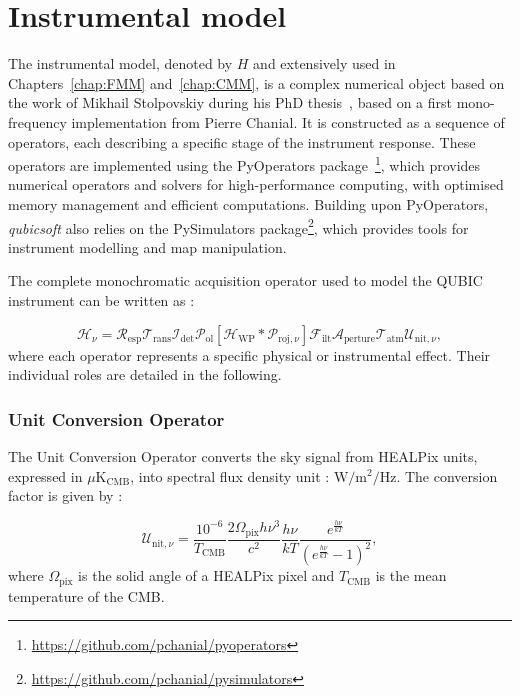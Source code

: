 \documentclass[../../thesis.tex]{subfiles}
\begin{document}
\section{Instrumental model} \label{section:instrumental_model}

The instrumental model, denoted by $H$ and extensively used in Chapters~\ref{chap:FMM} and~\ref{chap:CMM}, is a complex numerical object based on the work of Mikhail Stolpovskiy during his PhD thesis~\cite{thesismikhail}, based on a first mono-frequency implementation from Pierre Chanial. It is constructed as a sequence of operators, each describing a specific stage of the instrument response.
These operators are implemented using the PyOperators package~\cite{PyOperators}\footnote{\url{https://github.com/pchanial/pyoperators}}, which provides numerical operators and solvers for high-performance computing, with optimised memory management and efficient computations. Building upon PyOperators, \emph{qubicsoft} also relies on the PySimulators package\footnote{\url{https://github.com/pchanial/pysimulators}}, which provides tools for instrument modelling and map manipulation.

The complete monochromatic acquisition operator used to model the QUBIC instrument can be written as :

\begin{equation}
    \mathcal{H}_{\nu} = \mathcal{R}_{\text{esp}} \mathcal{T}_{\text{rans}} \mathcal{I}_{\text{det}} \mathcal{P}_{\text{ol}} [\mathcal{H}_{\text{WP}} * \mathcal{P}_{\text{roj}, \nu}] \mathcal{F}_{\text{ilt}} \mathcal{A}_{\text{perture}} \mathcal{T}_{\text{atm}} \mathcal{U}_{\text{nit}, \nu},
    \label{eq:instrumental_model}
\end{equation}
where each operator represents a specific physical or instrumental effect. Their individual roles are detailed in the following.

\subsubsection{Unit Conversion Operator}

The Unit Conversion Operator converts the sky signal from HEALPix units, expressed in $\mu\text{K}_{\text{CMB}}$, into spectral flux density unit : $\text{W}/\text{m}^2/\text{Hz}$. The conversion factor is given by : 

\begin{equation}
    \mathcal{U}_{\text{nit}, \nu} = \frac{10^{-6}}{T_{\text{CMB}}} \frac{2 \Omega_{\text{pix}} h \nu^3}{c^2} \frac{h \nu}{k T} \frac{e^{\frac{h \nu}{k T}}}{(e^{\frac{h \nu}{k T}} - 1)^2},
\end{equation}
where $\Omega_{\mathrm{pix}}$ is the solid angle of a HEALPix pixel and $T_{\mathrm{CMB}}$ is the mean temperature of the CMB.
\end{document}
